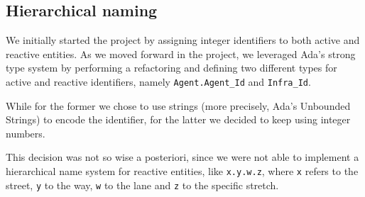 \subsection{Hierarchical naming}
We initially started the project by assigning integer identifiers to both
active and reactive entities. As we moved forward in the project, we leveraged
Ada's strong type system by performing a refactoring and defining two different
types for active and reactive identifiers, namely \texttt{Agent.Agent\_Id} and
\texttt{Infra\_Id}.

While for the former we chose to use strings (more precisely, Ada's Unbounded
Strings) to encode the identifier, for the latter we decided to keep using
integer numbers.

This decision was not so wise a posteriori, since we were not able to implement
a hierarchical name system for reactive entities, like \texttt{x.y.w.z}, where
\texttt{x} refers to the street, \texttt{y} to the way, \texttt{w} to the lane
and \texttt{z} to the specific stretch.




